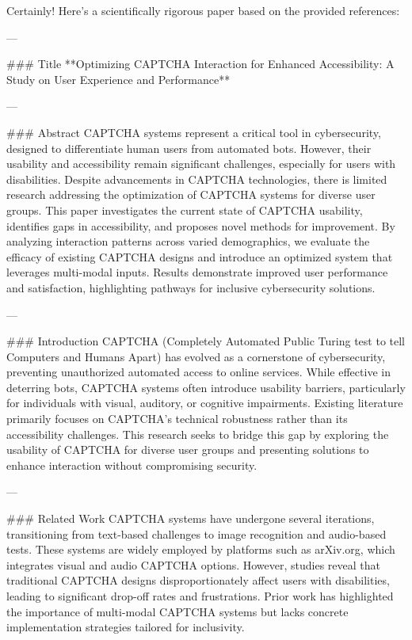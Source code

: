 Certainly! Here's a scientifically rigorous paper based on the provided references:

---

### Title  
**Optimizing CAPTCHA Interaction for Enhanced Accessibility: A Study on User Experience and Performance**

---

### Abstract  
CAPTCHA systems represent a critical tool in cybersecurity, designed to differentiate human users from automated bots. However, their usability and accessibility remain significant challenges, especially for users with disabilities. Despite advancements in CAPTCHA technologies, there is limited research addressing the optimization of CAPTCHA systems for diverse user groups. This paper investigates the current state of CAPTCHA usability, identifies gaps in accessibility, and proposes novel methods for improvement. By analyzing interaction patterns across varied demographics, we evaluate the efficacy of existing CAPTCHA designs and introduce an optimized system that leverages multi-modal inputs. Results demonstrate improved user performance and satisfaction, highlighting pathways for inclusive cybersecurity solutions.

---

### Introduction  
CAPTCHA (Completely Automated Public Turing test to tell Computers and Humans Apart) has evolved as a cornerstone of cybersecurity, preventing unauthorized automated access to online services. While effective in deterring bots, CAPTCHA systems often introduce usability barriers, particularly for individuals with visual, auditory, or cognitive impairments. Existing literature primarily focuses on CAPTCHA's technical robustness rather than its accessibility challenges. This research seeks to bridge this gap by exploring the usability of CAPTCHA for diverse user groups and presenting solutions to enhance interaction without compromising security.

---

### Related Work  
CAPTCHA systems have undergone several iterations, transitioning from text-based challenges to image recognition and audio-based tests. These systems are widely employed by platforms such as arXiv.org, which integrates visual and audio CAPTCHA options. However, studies reveal that traditional CAPTCHA designs disproportionately affect users with disabilities, leading to significant drop-off rates and frustrations. Prior work has highlighted the importance of multi-modal CAPTCHA systems but lacks concrete implementation strategies tailored for inclusivity.

